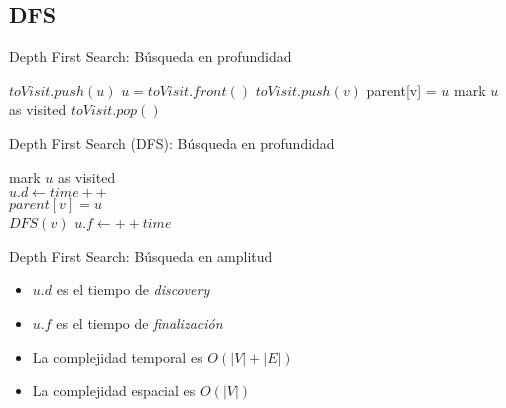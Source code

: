 \documentclass[]{beamer}
\begin{document}
\subsection{DFS}
\begin{frame}{Depth First Search: B\'usqueda en profundidad}
  \begin{algorithm}[H]
    {$ toVisit.push(u) $} 
    {
      $u = toVisit.front() $
      {
        {
          {$ toVisit.push(v)  $} \;
          { parent[v] = $u$ } \;
          { mark $u$ as visited } \;
        }
      }
      { $toVisit.pop()$ }
    }
  \end{algorithm}
\end{frame}


\begin{frame}{Depth First Search (DFS): B\'usqueda en profundidad}
  \begin{algorithm}[H]
    mark $u$ as visited \\
    $u.d \gets time++$ \\
    {
      {
        $ parent[v] = u $ \\
        $ DFS(v) $
      }
    }
    $u.f \gets ++time$ \\
  \end{algorithm}
\end{frame}

\begin{frame}{Depth First Search: B\'usqueda en amplitud}
  \begin{itemize}
    \item $u.d$ es el tiempo de \textit{discovery}
      \pause
    \item $u.f$ es el tiempo de \textit{finalizaci\'on}
      \pause
    \item La complejidad temporal es $O(|V| + |E|)$
      \pause
    \item La complejidad espacial es $O(|V|)$
  \end{itemize}
\end{frame}
\end{document}
